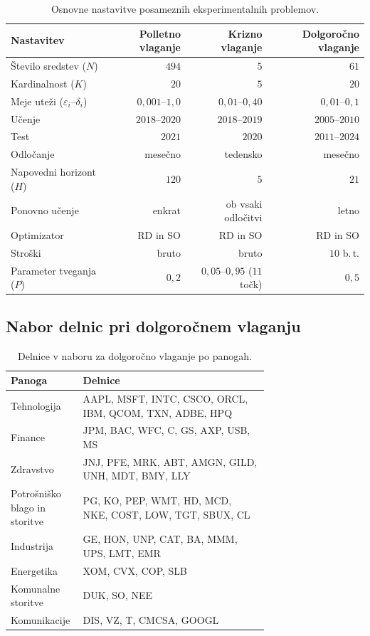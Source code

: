 \documentclass[9pt]{style/friteza}
\begin{document}
\begin{appendices}
\begin{table}[H]
\centering
\scriptsize
\renewcommand{\arraystretch}{1.1}
\caption{Osnovne nastavitve posameznih eksperimentalnih problemov.}
\label{tab:repro}
\begin{tabular*}{\linewidth}{@{\extracolsep{\fill}}lrrr}
\hline
Nastavitev & Polletno vlaganje & Krizno vlaganje & Dolgoročno vlaganje  \\
\hline
Število sredstev ($N$) & $494$ & $5$ & $61$  \\
Kardinalnost ($K$) & $20$ & $5$ & $20$  \\
Meje uteži ($\varepsilon_i$--$\delta_i$) & $0{,}001$--$1{,}0$ & $0{,}01$--$0{,}40$ & $0{,}01$--$0{,}1$  \\
Učenje & $2018$--$2020$ & $2018$--$2019$ & $2005$--$2010$  \\
Test & $2021$ & $2020$ & $2011$--$2024$  \\
Odločanje & mesečno & tedensko & mesečno  \\
Napovedni horizont ($H$) & $120$ & $5$ & $21$  \\
Ponovno učenje & enkrat & ob vsaki odločitvi & letno  \\
Optimizator & RD in SO & RD in SO & RD in SO  \\
Stroški & bruto & bruto & $10$ b.\,t.  \\
Parameter tveganja ($P$) & $0{,}2$ & $0{,}05$--$0{,}95$ ($11$ točk) & $0{,}5$  \\
\hline
\end{tabular*}
\end{table}

\subsection{Nabor delnic pri dolgoročnem vlaganju}\label{sec:longterm-universe}

\begin{table}[H]
\centering
\scriptsize
\renewcommand{\arraystretch}{1.1}
\caption{Delnice v naboru za dolgoročno vlaganje po panogah.}
\label{tab:universe}
\scriptsize
\renewcommand{\arraystretch}{1.1}
\begin{tabular*}{\linewidth}{@{\extracolsep{\fill}}lp{0.72\linewidth}}
\hline
Panoga & Delnice \\
\hline
Tehnologija & AAPL, MSFT, INTC, CSCO, ORCL, IBM, QCOM, TXN, ADBE, HPQ \\
Finance & JPM, BAC, WFC, C, GS, AXP, USB, MS \\
Zdravstvo & JNJ, PFE, MRK, ABT, AMGN, GILD, UNH, MDT, BMY, LLY \\
Potrošniško blago in storitve & PG, KO, PEP, WMT, HD, MCD, NKE, COST, LOW, TGT, SBUX, CL \\
Industrija & GE, HON, UNP, CAT, BA, MMM, UPS, LMT, EMR \\
Energetika & XOM, CVX, COP, SLB \\
Komunalne storitve & DUK, SO, NEE \\
Komunikacije & DIS, VZ, T, CMCSA, GOOGL \\
\hline
\end{tabular*}
\end{table}
\end{appendices}
\end{document}
